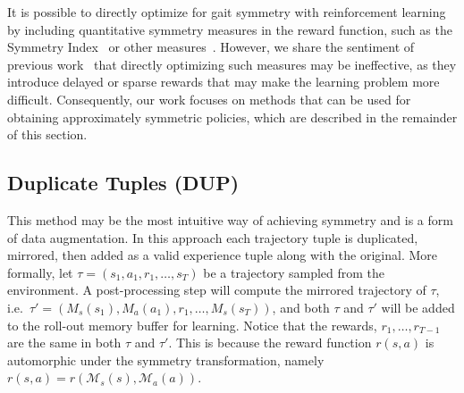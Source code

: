 It is possible to directly optimize for gait symmetry with reinforcement learning by 
including quantitative symmetry measures in the reward function, such as the Symmetry Index~\citep{robinson1987use} 
or other measures~\citep{symmetry_measures}. However, we share the sentiment 
of previous work~\citep{Yu-SIGGRAPH-2018} that directly optimizing such measures 
may be ineffective, as they introduce delayed or sparse rewards that may make the learning problem more difficult.  
Consequently, our work focuses on methods that can be used for obtaining approximately 
symmetric policies, which are described in the remainder of this section.




\subsection{Duplicate Tuples (DUP)}
\label{subsec:dup_epx}
This method may be the most intuitive way of achieving symmetry and is a form of data augmentation.  
In this approach each trajectory tuple is duplicated, mirrored, then
added as a valid experience tuple along with the original.  
More formally, let $\tau=(s_1, a_1, r_1, \dots, s_T)$ 
be a trajectory sampled from the environment.  
A post-processing step will compute the mirrored trajectory of $\tau$, 
i.e.\ $\tau' = \left( M_s(s_1), M_a(a_1), r_1, \dots, M_s(s_T) \right)$, and both $\tau$ and $\tau'$ 
will be added to the roll-out memory buffer for learning.  
Notice that the rewards, $r_1, \dots, r_{T-1}$ are the same in both $\tau$ and $\tau'$.  
This is because the reward function $r(s, a)$ is automorphic under the symmetry transformation, namely 
$r(s, a) = r(\mathcal{M}_s(s), \mathcal{M}_a(a))$.

